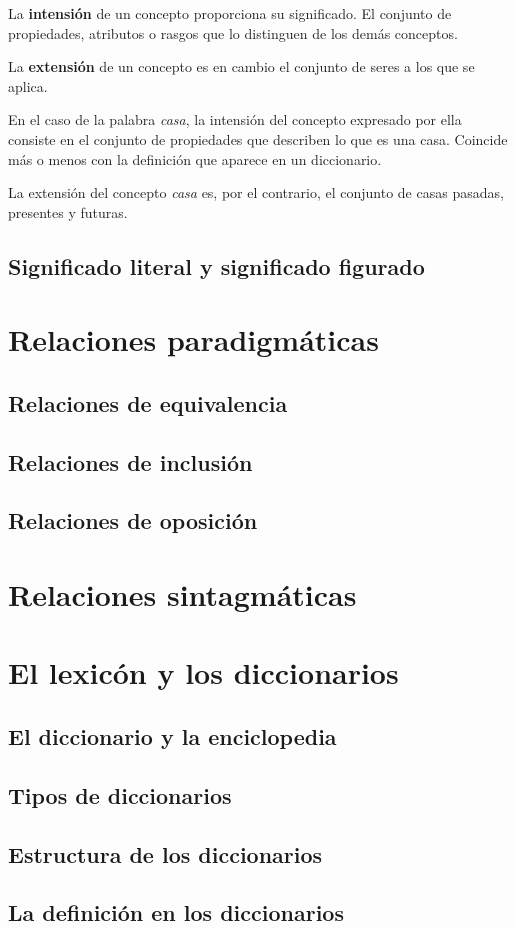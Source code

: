 \documentclass[12pt]{article}
\begin{document}
La \textbf{intensión} de un concepto proporciona su significado. El conjunto de propiedades, atributos o rasgos que lo distinguen de los demás conceptos.

La \textbf{extensión} de un concepto es en cambio el conjunto de seres a los que se aplica.

En el caso de la palabra \textit{casa}, la intensión del concepto expresado por ella consiste en el conjunto de propiedades que describen lo que es una casa. Coincide más o menos con la definición que aparece en un diccionario.

La extensión del concepto \textit{casa} es, por el contrario, el conjunto de casas pasadas, presentes y futuras.

\subsection{Significado literal y significado figurado}
\section{Relaciones paradigmáticas}
\subsection{Relaciones de equivalencia}
\subsection{Relaciones de inclusión}
\subsection{Relaciones de oposición}
\section{Relaciones sintagmáticas}
\section{El lexicón y los diccionarios}
\subsection{El diccionario y la enciclopedia}
\subsection{Tipos de diccionarios}
\subsection{Estructura de los diccionarios}
\subsection{La definición en los diccionarios}
\end{document}
